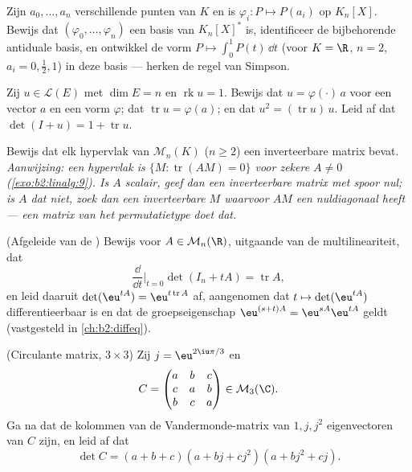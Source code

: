 \begin{exercise}[$\star\star$]\label{exo:b2:linalg:4}
Zijn $a_0, \dots, a_n$ verschillende punten van $K$ en is
$\varphi_i \colon P \mapsto P(a_i)$ op $K_n[X]$. Bewijs dat
$(\varphi_0, \dots, \varphi_n)$ een basis van $K_n[X]^*$ is,
identificeer de bijbehorende antiduale basis, en ontwikkel de vorm
$P \mapsto \int_0^1 P(t)\,\dd t$ (voor $K = \R$, $n = 2$, $a_i =
0, \frac12, 1$) in deze basis --- herken de regel van Simpson.
\end{exercise}

\begin{exercise}[$\star\star$]\label{exo:b2:linalg:5}
Zij $u \in \mathcal{L}(E)$ met $\dim E = n$ en $\operatorname{rk} u
= 1$. Bewijs dat $u = \varphi(\cdot)\, a$ voor een vector $a$ en
een vorm $\varphi$; dat $\operatorname{tr} u = \varphi(a)$; en dat
$u^2 = (\operatorname{tr} u)\, u$. Leid af dat $\det(I + u) = 1 +
\operatorname{tr} u$.
\end{exercise}

\begin{exercise}[$\star\star$]\label{exo:b2:linalg:6}
Bewijs dat elk hypervlak van $\mathcal{M}_n(K)$ ($n \geq 2$) een
inverteerbare matrix bevat. \emph{Aanwijzing: een hypervlak is
$\{M : \operatorname{tr}(AM) = 0\}$ voor zekere $A \neq 0$
(\cref{exo:b2:linalg:9}). Is $A$ scalair, geef dan een
inverteerbare matrix met spoor nul; is $A$ dat niet, zoek dan een
inverteerbare $M$ waarvoor $AM$ een nuldiagonaal heeft --- een
matrix van het permutatietype doet dat.}
\end{exercise}

\begin{exercise}[$\star\star$]\label{exo:b2:linalg:7}
(Afgeleide van de ) Bewijs voor $A \in
\mathcal{M}_n(\R)$, uitgaande van de multilineariteit, dat
\[
\frac{\dd}{\dd t}\Big|_{t=0} \det(I_n + tA) = \operatorname{tr} A ,
\]
en leid daaruit $\det(\eu^{tA}) = \eu^{t\operatorname{tr} A}$ af,
aangenomen dat $t \mapsto \det(\eu^{tA})$ differentieerbaar is en
dat de groepseigenschap $\eu^{(s+t)A} = \eu^{sA}\eu^{tA}$ geldt
(vastgesteld in \cref{ch:b2:diffeq}).
\end{exercise}

\begin{exercise}[$\star\star$]\label{exo:b2:linalg:8}
(Circulante matrix, $3 \times 3$) Zij $j = \eu^{2\iu\pi/3}$ en
\[
C = \begin{pmatrix}
a & b & c\\
c & a & b\\
b & c & a
\end{pmatrix} \in \mathcal{M}_3(\C).
\]
Ga na dat de kolommen van de Vandermonde-matrix van $1, j, j^2$
eigenvectoren van $C$ zijn, en leid af dat
\[
\det C = (a + b + c)(a + bj + cj^2)(a + bj^2 + cj).
\]
\end{exercise}

